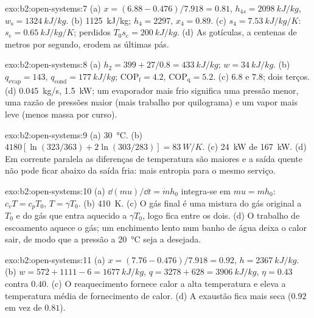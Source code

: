 \begin{solution}{exo:b2:open-systems:7}
(a) $x = (6.88 - 0.476)/7.918 = 0.81$, $h_{4s} = \qty{2098}{kJ/kg}$, $w_{\text{s}} =
\qty{1324}{kJ/kg}$. (b) \qty{1125}{kJ/kg}; $h_4 = 2297$, $x_4 = 0.89$. (c) $s_4 =
\qty{7.53}{kJ/kg/K}$: $s_{\text{c}} = \qty{0.65}{kJ/kg/K}$; perdidos $T_0s_{\text{c}} =
\qty{200}{kJ/kg}$. (d) As gotículas, a centenas de metros por segundo, erodem as
últimas pás.
\end{solution}

\begin{solution}{exo:b2:open-systems:8}
(a) $h_2 = 399 + 27/0.8 = \qty{433}{kJ/kg}$; $w = \qty{34}{kJ/kg}$. (b) $q_{\text{evap}}
= 143$, $q_{\text{cond}} = \qty{177}{kJ/kg}$; $\mathrm{COP}_{\text{f}} = 4.2$,
$\mathrm{COP}_{\text{q}} = 5.2$. (c) $6.8$ e $7.8$; dois terços. (d) \qty{0.045}{kg/s},
\qty{1.5}{kW}; um evaporador mais frio significa uma pressão menor, uma
razão de pressões maior (mais trabalho por quilograma) e um vapor mais leve (menos
massa por curso).
\end{solution}

\begin{solution}{exo:b2:open-systems:9}
(a) \qty{30}{\celsius}. (b) $4180[\ln(323/363) + 2\ln(303/283)] = \qty{83}{W/K}$.
(c) \qty{24}{kW} de \qty{167}{kW}. (d) Em corrente paralela as diferenças de temperatura são
maiores e a saída quente não pode ficar abaixo da saída fria: mais
entropia para o mesmo serviço.
\end{solution}

\begin{solution}{exo:b2:open-systems:10}
(a) $\dd(mu)/\dd t = \dot m h_0$ integra-se em $mu = mh_0$: $c_vT = c_pT_0$,
$T = \gamma T_0$. (b) \qty{410}{K}. (c) O gás final é uma mistura do
gás original a $T_0$ e do gás que entra aquecido a $\gamma T_0$, logo
fica entre os dois. (d) O trabalho de escoamento aquece o gás; um enchimento lento num banho
de água deixa o calor sair, de modo que a pressão a \qty{20}{\celsius} seja a
desejada.
\end{solution}

\begin{solution}{exo:b2:open-systems:11}
(a) $x = (7.76 - 0.476)/7.918 = 0.92$, $h = \qty{2367}{kJ/kg}$. (b) $w = 572 + 1111
- 6 = \qty{1677}{kJ/kg}$, $q = 3278 + 628 = \qty{3906}{kJ/kg}$, $\eta = 0.43$
contra $0.40$. (c) O reaquecimento fornece calor a alta temperatura e
eleva a temperatura média de fornecimento de calor. (d) A exaustão fica mais seca
($0.92$ em vez de $0.81$).
\end{solution}

